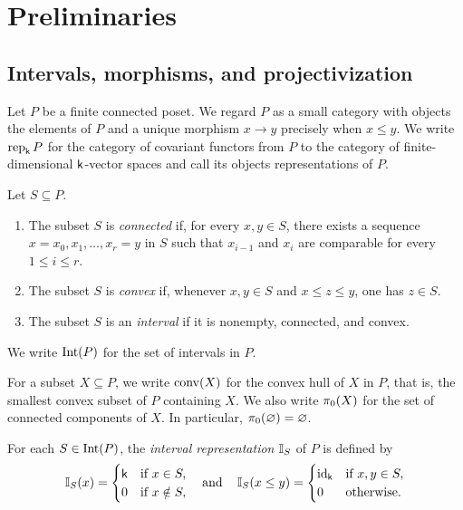 \section{Preliminaries}\label{sec:preliminaries}

\subsection{Intervals, morphisms, and projectivization}
\label{sec:prelim-intervals}

Let $P$ be a finite connected poset.  We regard $P$ as a small category
with objects the elements of $P$ and a unique morphism $x\to y$
precisely when $x\leq y$.  We write $\operatorname{rep}_{\mathsf{k}} P$ for the category of
covariant functors from $P$ to the category of finite-dimensional $\mathsf{k}$-vector spaces and call its objects representations of $P$.

\begin{definition}
Let $S\subseteq P$.
\begin{enumerate}[\rm (1)]
    \item The subset $S$ is \emph{connected} if, for every $x,y\in S$, there exists a sequence
    $x=x_0,x_1,\ldots,x_r=y$
    in $S$ such that $x_{i-1}$ and $x_i$ are comparable for every $1\leq i\leq r$.

    \item The subset $S$ is \emph{convex} if, whenever $x,y\in S$ and $x\leq z\leq y$, one has $z\in S$.

    \item The subset $S$ is an \emph{interval} if it is nonempty, connected, and convex.
\end{enumerate}
We write $\operatorname{Int}(P)$ for the set of intervals in $P$. 

For a subset $X\subseteq P$, we write $\operatorname{conv}(X)$ for the convex hull of
$X$ in $P$, that is, the smallest convex subset of $P$ containing $X$.
We also write $\pi_0(X)$ for the set of connected components of $X$.
In particular,
$\pi_0(\varnothing)=\varnothing$.
\end{definition}

For each $S\in\operatorname{Int}(P)$, the \emph{interval representation} $\mathbb I_S$ of $P$ is defined by
\begin{equation}
\mathbb I_S(x)
=
\begin{cases}
\mathsf{k} & \text{if } x\in S,\\
0   & \text{if } x\notin S,
\end{cases}
\operatorname{\quad \text{and} \quad}\nolimits
\mathbb I_S(x\leq y)
=
\begin{cases}
\operatorname{id}_{\mathsf{k}} & \text{if } x,y\in S,\\
0         & \text{otherwise}.
\end{cases}
\label{eq:interval-module-definition}
\end{equation}


